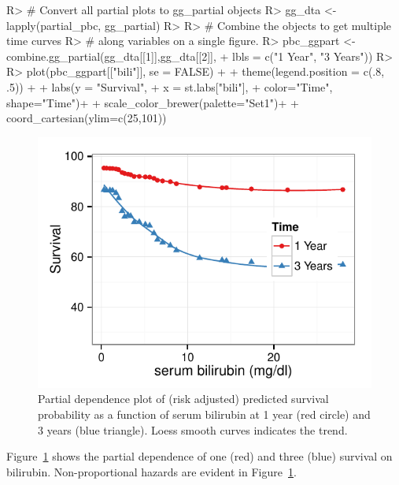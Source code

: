 \documentclass[nojss]{jss}\usepackage[]{graphicx}\usepackage[]{color}
\makeatletter
\def\maxwidth{ %
  \ifdim\Gin@nat@width>\linewidth
    \linewidth
  \else
    \Gin@nat@width
  \fi
}
\makeatother
\begin{document}
\begin{Schunk}
\begin{Sinput}
R> # Convert all partial plots to gg_partial objects
R> gg_dta <- lapply(partial_pbc, gg_partial)
R> 
R> # Combine the objects to get multiple time curves 
R> # along variables on a single figure.
R> pbc_ggpart <- combine.gg_partial(gg_dta[[1]],gg_dta[[2]], 
+                                  lbls = c("1 Year", "3 Years"))
R> 
R> plot(pbc_ggpart[["bili"]], se = FALSE) + 
+   theme(legend.position = c(.8, .5)) + 
+   labs(y = "Survival", 
+        x = st.labs["bili"],
+        color="Time", shape="Time")+
+   scale_color_brewer(palette="Set1")+
+   coord_cartesian(ylim=c(25,101))
\end{Sinput}
\begin{figure}[!htpb]

{\centering \includegraphics[width=\maxwidth]{figure/rfs-pbc-partial-bili-1} 

}

\caption[Partial dependence plot of (risk adjusted) predicted survival probability as a function of serum bilirubin at 1 year (red circle) and 3 years (blue triangle)]{Partial dependence plot of (risk adjusted) predicted survival probability as a function of serum bilirubin at 1 year (red circle) and 3 years (blue triangle). Loess smooth curves indicates the trend.\label{fig:pbc-partial-bili}}
\end{figure}
\end{Schunk}

Figure~\ref{fig:pbc-partial-bili} shows the partial dependence of one (red) and three (blue) survival on bilirubin. Non-proportional hazards are evident in Figure~\ref{fig:pbc-partial-bili}.
\end{document}
